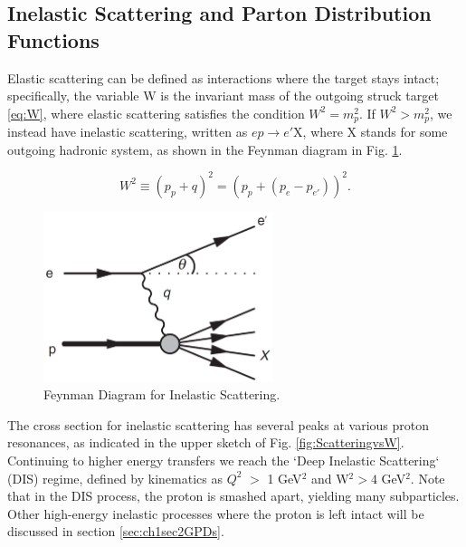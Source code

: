 





    \subsection{Inelastic Scattering and Parton Distribution Functions}

        Elastic scattering can be defined as interactions where the target stays intact; specifically, the variable W is the invariant mass of the outgoing struck target \eqref{eq:W}, where elastic scattering satisfies the condition $W^2 =m_p^2$. If $W^2 > m_p^2$, we instead have inelastic scattering, written as $ep \rightarrow e'$X, where X stands for some outgoing hadronic system, as shown in the Feynman diagram in Fig. \ref{fig:FeynmanInelastic}.    

        \begin{equation}\label{eq:W}
            W^2 \equiv (p_p + q)^2 = (p_p + (p_e-p_{e'}))^2.
        \end{equation}
          

    
        \begin{figure}[ht]
            \centering
            \includegraphics[width=0.6\textwidth]{Chapters/Ch1-Intro/Ch1-Sec1-Background/pics/inelastic-ep/eppx.png}
            \caption{Feynman Diagram for Inelastic Scattering.}
            \label{fig:FeynmanInelastic}
        \end{figure}

        The cross section for inelastic scattering has several peaks at various proton resonances, as indicated in the upper sketch of Fig. \ref{fig:ScatteringvsW}. Continuing to higher energy transfers we reach the `Deep Inelastic Scattering` (DIS) regime, defined by kinematics as $Q^2$ $>$ 1 GeV$^2$ and W$^2 > 4$ GeV$^2$. Note that in the DIS process, the proton is smashed apart, yielding many subparticles. Other high-energy inelastic processes where the proton is left intact will be discussed in section \ref{sec:ch1sec2GPDs}. 

